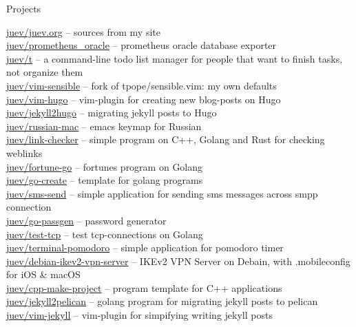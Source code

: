 \documentclass{resume} %
\begin{document}

\begin{rSection}{Projects}

\href{https://github.com/juev/juev.org}{juev/juev.org} -- sources from my site \\ %
\href{https://github.com/juev/prometheus\_oracle}{juev/prometheus\_oracle} -- prometheus oracle database exporter \\ %
\href{https://github.com/juev/t}{juev/t} -- a command-line todo list manager for people that want to finish tasks, not organize them \\ %
\href{https://github.com/juev/vim-sensible}{juev/vim-sensible} -- fork of tpope/sensible.vim: my own defaults \\ %
\href{https://github.com/juev/vim-hugo}{juev/vim-hugo} -- vim-plugin for creating new blog-posts on Hugo \\ %
\href{https://github.com/juev/jekyll2hugo}{juev/jekyll2hugo} -- migrating jekyll posts to Hugo \\ %
\href{https://github.com/juev/russian-mac}{juev/russian-mac} -- emacs keymap for Russian \\ %
\href{https://github.com/juev/link-checker}{juev/link-checker} -- simple program on C++, Golang and Rust for checking weblinks \\ %
\href{https://github.com/juev/fortune-go}{juev/fortune-go} -- fortunes program on Golang \\ %
\href{https://github.com/juev/go-create}{juev/go-create} -- template for golang programs \\ %
\href{https://github.com/juev/sms-send}{juev/sms-send} -- simple application for sending sms messages across smpp connection \\ %
\href{https://github.com/juev/go-passgen}{juev/go-passgen} -- password generator \\ %
\href{https://github.com/juev/test-tcp}{juev/test-tcp} -- test tcp-connections on Golang \\ %
\href{https://github.com/juev/terminal-pomodoro}{juev/terminal-pomodoro} -- simple application for pomodoro timer \\ %
\href{https://github.com/juev/debian-ikev2-vpn-server}{juev/debian-ikev2-vpn-server} -- IKEv2 VPN Server on Debain, with .mobileconfig for iOS \& macOS \\ %
\href{https://github.com/juev/cpp-make-project}{juev/cpp-make-project} -- program template for C++ applications \\ %
\href{https://github.com/juev/jekyll2pelican}{juev/jekyll2pelican} -- golang program for migrating jekyll posts to pelican \\ %
\href{https://github.com/juev/vim-jekyll}{juev/vim-jekyll} -- vim-plugin for simpifying writing jekyll posts \\ %

\end{rSection}
\end{document}
